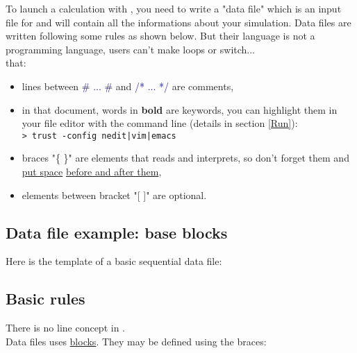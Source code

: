 To launch a calculation with \trust, you need to write a "data file" which is an input file for \trust and will contain all the informations about your simulation.
Data files are written following some rules as shown below. But their language is not a programming language, users can't make loops or switch...\\

\Note that:
\begin{itemize}
\item lines between \textcolor{blue}{\# ... \#} and \textcolor{blue}{/* ... */} are comments,
\item in that document, words in \textbf{bold} are \trust keywords, you can highlight them in your file editor with the command line (details in section \ref{Run}):\\
\texttt{> trust -config nedit|vim|emacs}
\item braces "\{ \}" are elements that \trust reads and interprets, so don't forget them and \underline{put space} \underline{before and after them},
\item elements between bracket "[ ]" are optional.
\end{itemize}

\subsection{Data file example: base blocks} \label{data}
Here is the template of a basic sequential data file:\\






\subsection{Basic rules}
There is no line concept in \trust.\\

Data files uses \underline{blocks}. They may be defined using the braces:\\
    \begin{center}
    \end{center}
\bigskip{}


